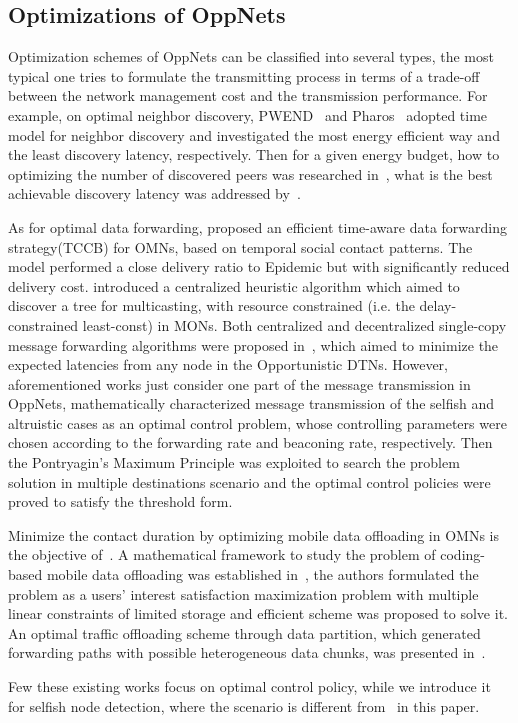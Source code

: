 \subsection{Optimizations of OppNets}
Optimization schemes of OppNets can be classified into
several types, the most typical one tries to formulate
the transmitting process in terms of a trade-off between
the network management cost and the transmission performance.
For example, on optimal neighbor discovery,
PWEND~\cite{DBLP:journals/adhoc/ChenQLLWYL20} and
Pharos~\cite{DBLP:conf/secon/Zhu00L19} adopted time model
for neighbor discovery and investigated the most energy efficient way
and the least discovery latency, respectively.
Then for a given energy budget,
how to optimizing the number of discovered peers was researched
in~\cite{DBLP:journals/tmc/LoretiB20},
what is the best achievable discovery latency was addressed
by~\cite{DBLP:conf/sigcomm/KindtC19}.

As for optimal data forwarding,
\cite{DBLP:journals/tvt/ZhouLZXF17} proposed an
efficient time-aware data forwarding strategy(TCCB) for OMNs,
 based on temporal social contact patterns.
 The model performed a close delivery ratio to
 Epidemic but with significantly reduced delivery cost.
\cite{DBLP:journals/tvt/LiuWXWLY17} introduced
a centralized heuristic algorithm
which aimed to discover a tree for multicasting,
with resource constrained (i.e. the delay-constrained least-const) in MONs.
Both centralized and decentralized single-copy message forwarding algorithms
were proposed in~\cite{DBLP:journals/tsipn/ShaghaghianC15},
which aimed to minimize the expected latencies
from any node in the Opportunistic DTNs.
However, aforementioned works just consider one part of
the message transmission in OppNets,
\cite{DBLP:journals/tcss/WuDH18} mathematically characterized
message transmission of the selfish
and altruistic cases as an optimal control problem,
whose controlling parameters were chosen according
to the forwarding rate and beaconing rate, respectively.
Then the Pontryagin's Maximum Principle was exploited
to search the problem solution in multiple destinations scenario
and the optimal control policies were proved to satisfy the threshold form.

Minimize the contact duration by optimizing
mobile data offloading in OMNs is the objective
of~\cite{DBLP:journals/tits/LiJWZ014,DBLP:conf/icc/WangW18}.
A mathematical framework to study the problem of
coding-based mobile data offloading
was established in~\cite{DBLP:journals/tits/LiJWZ014},
the authors formulated the problem as a users' interest
satisfaction maximization problem 
with multiple linear constraints of
limited storage and efficient scheme
was proposed to solve it.
An optimal traffic offloading scheme through
data partition, which generated forwarding paths
with possible heterogeneous data chunks,
was presented in~\cite{DBLP:conf/icc/WangW18}.

Few these existing works focus on
optimal control policy, while we introduce it
for selfish node detection,
where the scenario is different from~\cite{DBLP:journals/tcss/WuDH18} in this paper.
